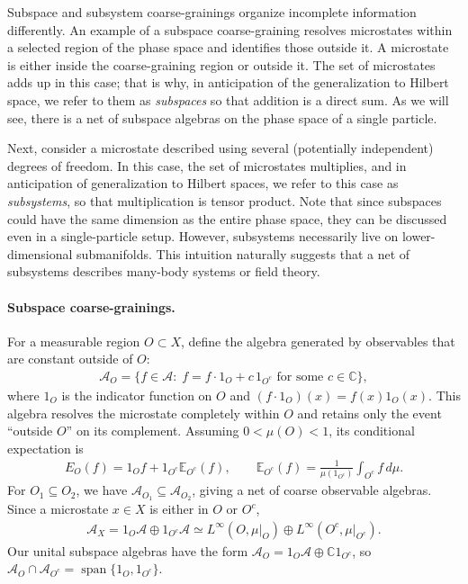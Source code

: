 \documentclass[a4paper,11pt]{article}
\theoremstyle{definition}
\theoremstyle{remark}
\newcommand{\mA}{\mathcal{A}}
\begin{document}
Subspace and subsystem coarse-grainings organize incomplete information differently.
An example of a subspace coarse-graining resolves microstates within a selected region
of the phase space and identifies those outside it.  A microstate is either inside the
coarse-graining region or outside it.  The set of microstates adds up in this case;
that is why, in anticipation of the generalization to Hilbert space, we refer to them
as \emph{subspaces} so that addition is a direct sum.  As we will see, there is a net
of subspace algebras on the phase space of a single particle.
 
Next, consider a microstate described using several (potentially independent) degrees
of freedom.  In this case, the set of microstates multiplies, and in anticipation of
generalization to Hilbert spaces, we refer to this case as \emph{subsystems}, so that
multiplication is tensor product.  Note that since subspaces could have the same
dimension as the entire phase space, they can be discussed even in a single-particle
setup.  However, subsystems necessarily live on lower-dimensional submanifolds.  This
intuition naturally suggests that a net of subsystems describes many-body systems or
field theory.
 
\paragraph{Subspace coarse-grainings.}
For a measurable region $O\subset X$, define the algebra generated by observables that
are constant outside of $O$:
\begin{align}
    \mA_O=\{f\in\mA:\; f=f \cdot 1_O +c\, 1_{O^c}\text{ for some }c\in\mathbb{C}\},
\end{align}
where $1_O$ is the indicator function on $O$ and $(f\cdot 1_O)(x)=f(x)1_O(x)$.  This
algebra resolves the microstate completely within $O$ and retains only the event
``outside $O$'' on its complement.  Assuming $0<\mu(O)<1$, its conditional expectation
is
\begin{align}
    E_O(f)=1_O f + 1_{O^c}\mathbb{E}_{O^c}(f),\qquad
    \mathbb{E}_{O^c}(f)=\frac{1}{\mu(1_{O^c})}\int_{O^c} f\,d\mu.
\end{align}
For $O_1\subseteq O_2$, we have $\mA_{O_1}\subseteq\mA_{O_2}$, giving a net of coarse
observable algebras.  Since a microstate $x\in X$ is either in $O$ or $O^c$,
\begin{align}
    \mA_X=1_O\mA\oplus 1_{O^c}\mA
    \simeq L^\infty(O,\mu|_O)\oplus L^\infty(O^c,\mu|_{O^c}).
\end{align}
Our unital subspace algebras have the form $\mA_O=1_O\mA\oplus\mathbb{C}1_{O^c}$, so
$\mA_O\cap\mA_{O^c}=\operatorname{span}\{1_O,1_{O^c}\}$.
 
\end{document}
